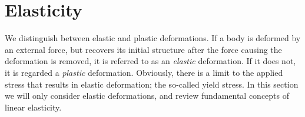 \documentclass[twoside,english]{uiofysmaster}
\begin{document}










\section{Elasticity}


We distinguish between elastic and plastic deformations.
If a body is deformed by an external force, but recovers its initial structure after the force causing the deformation is removed, it is referred to as an \textit{elastic} deformation. 
If it does not, it is regarded a \textit{plastic} deformation. 
Obviously, there is a limit to the applied stress that results in elastic deformation;  the so-called yield stress. 
In this section we will only consider elastic deformations, and review fundamental concepts of linear elasticity. 
\end{document}
